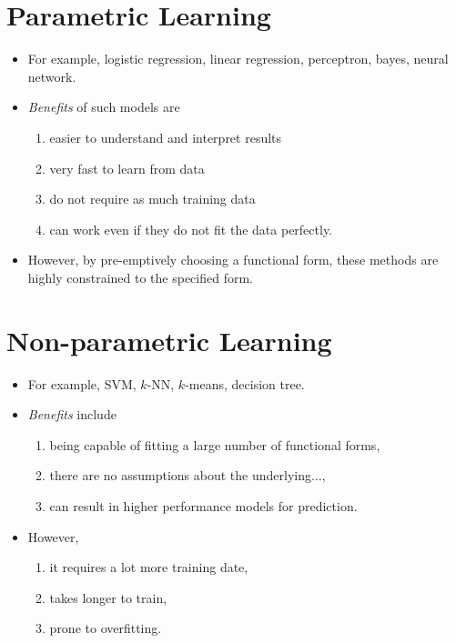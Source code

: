 \documentclass[
	number={1},
	title={Machine Learning Fundamentals}
]{cs584notes}
\begin{document}
\section{Parametric Learning}\label{sec:parametric-learning}
\begin{itemize}
	\item For example, logistic regression, linear regression, perceptron, \naive bayes, neural network.
	\item \emph{Benefits} of such models are
	\begin{enumerate}[label=(\alph*)]
		\item easier to understand and interpret results
		\item very fast to learn from data
		\item do not require as much training data
		\item can work even if they do not fit the data perfectly.
	\end{enumerate}
	\item However, by pre-emptively choosing a functional form, these methods are highly constrained to the specified form.
\end{itemize}

\section{Non-parametric Learning}\label{sec:non-parametric-learning}
\begin{itemize}
	\item For example, SVM, $k$-NN, $k$-means, decision tree.
	\item \emph{Benefits} include
	\begin{enumerate}[label=(\alph*)]
		\item being capable of fitting a large number of functional forms,
		\item there are no assumptions about the underlying$\dots$,
		\item can result in higher performance models for prediction.
	\end{enumerate}
	\item However,
	\begin{enumerate}[label=(\alph*)]
		\item it requires a lot more training date,
		\item takes longer to train,
		\item prone to overfitting.
	\end{enumerate}
\end{itemize}
\end{document}
